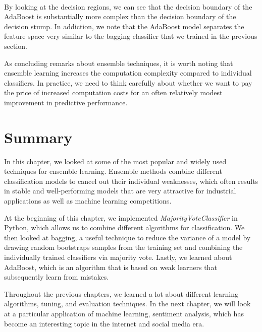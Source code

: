 \documentclass[11pt]{article}
\begin{document}
    \begin{center}
    \end{center}
    { \hspace*{\fill} \\}
    
    By looking at the decision regions, we can see that the decision
boundary of the AdaBoost is substantially more complex than the decision
boundary of the decision stump. In addiction, we note that the AdaBoost
model separates the feature space very similar to the bagging classifier
that we trained in the previous section.

As concluding remarks about ensemble techniques, it is worth noting that
ensemble learning increases the computation complexity compared to
individual classifiers. In practice, we need to think carefully about
whether we want to pay the price of increased computation costs for an
often relatively modest improvement in predictive performance.

    \section{Summary}\label{summary}

    In this chapter, we looked at some of the most popular and widely used
techniques for ensemble learning. Ensemble methods combine different
classification models to cancel out their individual weaknesses, which
often results in stable and well-performing models that are very
attractive for industrial applications as well as machine learning
competitions.

At the beginning of this chapter, we implemented
\emph{MajorityVoteClassifier} in Python, which allows us to combine
different algorithms for classification. We then looked at bagging, a
useful technique to reduce the variance of a model by drawing random
bootstraps samples from the training set and combining the individually
trained classifiers via majority vote. Lastly, we learned about
AdaBoost, which is an algorithm that is based on weak learners that
subsequently learn from mistakes.

Throughout the previous chapters, we learned a lot about different
learning algorithms, tuning, and evaluation techniques. In the next
chapter, we will look at a particular application of machine learning,
sentiment analysis, which has become an interesting topic in the
internet and social media era.


    
    
    
    
\end{document}
